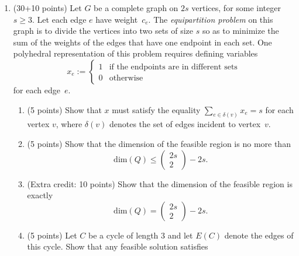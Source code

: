 \begin{enumerate}
   \item (30+10 points)   \label{equi_lp}
       Let $G$ be a complete graph on $2s$ vertices, for some integer~$s\geq 3$.
       Let each edge $e$ have weight~$c_e$.
       The {\em equipartition problem} on this graph is to divide the vertices
       into two sets of size $s$ so as to minimize the sum of the weights of
       the edges that have one endpoint in each set. One polyhedral
       representation of this problem requires defining variables
       \begin{displaymath}
         x_e := \left\{ \begin{array}{ll}
           1 & \mbox{if the endpoints are in different sets}  \\
           0 & \mbox{otherwise}
         \end{array}  \right.
       \end{displaymath}
       for each edge~$e$.
       \begin{enumerate}
         \item (5 points)  \label{degree}
            Show that $x$ must satisfy the equality
            $\sum_{e \in \delta(v)}x_e=s$
            for each vertex $v$, where $\delta(v)$ denotes the set of
            edges incident to vertex~$v$.
         \item (5 points)
            Show that the dimension of the feasible region is no more than
            \begin{displaymath}
              \mbox{dim}(Q) \leq \left( \begin{array}{c}2s\\2\end{array}
                 \right) - 2s.
            \end{displaymath}
         \item (Extra credit: 10 points)
            Show that the dimension of the feasible region is exactly
            \begin{displaymath}
              \mbox{dim}(Q) = \left( \begin{array}{c}2s\\2\end{array}
                 \right) - 2s.
            \end{displaymath}
         \item (5 points)  \label{tri}
            Let $C$ be a cycle of length 3 and let $E(C)$ denote the
            edges of this cycle.
            Show that any feasible solution satisfies
            \begin{displaymath}

\end{displaymath}
\end{enumerate}
\end{enumerate}
